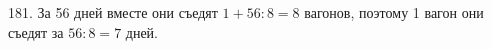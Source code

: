 181. За 56 дней вместе они съедят $1+56:8=8$ вагонов, поэтому 1 вагон они съедят за $56:8=7$ дней.\\
